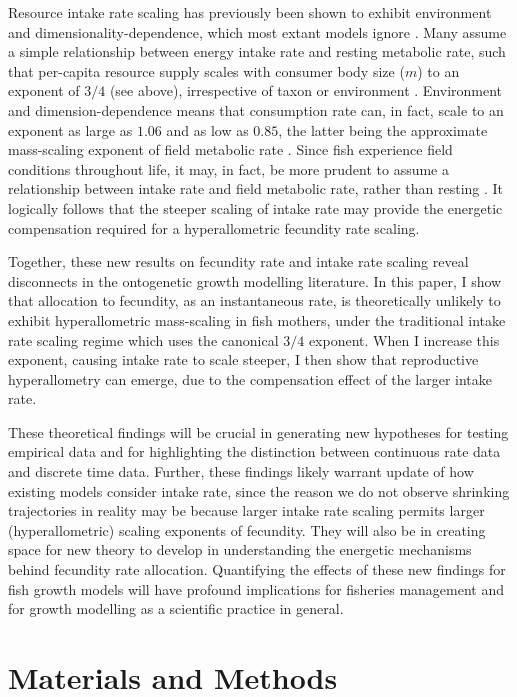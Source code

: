\documentclass[a4paper]{article} %
\begin{document}
    Resource intake rate scaling has previously been shown to exhibit environment and dimensionality-dependence, which most extant models ignore \autocite{Pawar2012}. Many assume a simple relationship between energy intake rate and resting metabolic rate, such that per-capita resource supply scales with consumer body size ($m$) to an exponent of $3/4$ (see above), irrespective of taxon or environment \autocite{Pawar2012}. Environment and dimension-dependence means that consumption rate can, in fact, scale to an exponent as large as $1.06$ and as low as $0.85$, the latter being the approximate mass-scaling exponent of field metabolic rate \autocite{peters1983,Weibel2004, Pawar2012}. Since fish experience field conditions throughout life, it may, in fact, be more prudent to assume a relationship between intake rate and field metabolic rate, rather than resting \autocite{Boisclair1993}. It logically follows that the steeper scaling of intake rate may provide the energetic compensation required for a hyperallometric fecundity rate scaling.

    Together, these new results on fecundity rate and intake rate scaling reveal disconnects in the ontogenetic growth modelling literature. In this paper, I show that allocation to fecundity, as an instantaneous rate, is theoretically unlikely to exhibit hyperallometric mass-scaling in fish mothers, under the traditional intake rate scaling regime which uses the canonical $3/4$ exponent. When I increase this exponent, causing intake rate to scale steeper, I then show that reproductive hyperallometry can emerge, due to the compensation effect of the larger intake rate.
    
    These theoretical findings will be crucial in generating new hypotheses for testing empirical data and for highlighting the distinction between continuous rate data and discrete time data. Further, these findings likely warrant update of how existing models consider intake rate, since the reason we do not observe shrinking trajectories in reality may be because larger intake rate scaling permits larger (hyperallometric) scaling exponents of fecundity. They will also be in creating space for new theory to develop in understanding the energetic mechanisms behind fecundity rate allocation. Quantifying the effects of these new findings for fish growth models will have profound implications for fisheries management and for growth modelling as a scientific practice in general.
\section{Materials and Methods}\thispagestyle{plain}
\end{document}
